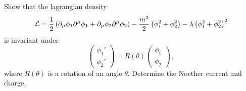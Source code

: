 \begin{ex} \label{ex_7} 
    Show that the lagrangian density
    \begin{equation}
    \label{lag_ex7}
        \mathcal{L} = \frac{1}{2} \left( \partial_\mu \phi_1 \partial^\mu \phi_1 + \partial_\mu \phi_2 \partial^\mu \phi_2 \right) - \frac{m^2}{2} \left( \phi_1^2 + \phi_2^2\right) - \lambda \left( \phi_1^2 + \phi_2^2\right)^2
    \end{equation}
    is invariant under
    \begin{equation}\label{rot}
        \begin{pmatrix} \phi_1' \\ \phi_2' \end{pmatrix} = R(\theta) \begin{pmatrix} \phi_1 \\ \phi_2 \end{pmatrix} \, ,
    \end{equation}
    where $R(\theta)$ is a rotation of an angle $\theta$. Determine the Noether current and charge.
\end{ex}


